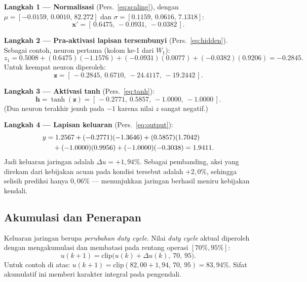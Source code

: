 \textbf{Langkah 1 --- Normalisasi} (Pers.~\ref{eq:scaling}), dengan
$\mu=[-0.0159,\,0.0010,\,82.272]$ dan $\sigma=[0.1159,\,0.0616,\,7.1318]$:
\begin{equation}
\mathbf{x'} = [\,0.6475,\ -0.0931,\ -0.0382\,].
\end{equation}

\textbf{Langkah 2 --- Pra-aktivasi lapisan tersembunyi} (Pers.~\ref{eq:hidden}).
Sebagai contoh, neuron pertama (kolom ke-1 dari $W_1$):
\begin{equation}
z_1 = 0.5008 + (0.6475)(-1.1576) + (-0.0931)(0.0077) + (-0.0382)(0.9206) = -0.2845.
\end{equation}
Untuk keempat neuron diperoleh:
\begin{equation}
\mathbf{z} = [\,-0.2845,\ 0.6710,\ -24.4117,\ -19.2442\,].
\end{equation}

\textbf{Langkah 3 --- Aktivasi tanh} (Pers.~\ref{eq:tanh}):
\begin{equation}
\mathbf{h} = \tanh(\mathbf{z}) = [\,-0.2771,\ 0.5857,\ -1.0000,\ -1.0000\,].
\end{equation}
(Dua neuron terakhir jenuh pada $-1$ karena nilai $z$ sangat negatif.)

\textbf{Langkah 4 --- Lapisan keluaran} (Pers.~\ref{eq:output}):
\begin{align}
y &= 1.2567 + (-0.2771)(-1.3646) + (0.5857)(1.7042) \notag\\
  &\quad + (-1.0000)(0.9956) + (-1.0000)(-0.3038) = 1.9411.
\end{align}
Jadi keluaran jaringan adalah $\Delta u = +1{,}94\%$. Sebagai pembanding, aksi yang
direkam dari kebijakan acuan pada kondisi tersebut adalah $+2{,}0\%$, sehingga selisih
prediksi hanya $0{,}06\%$ --- menunjukkan jaringan berhasil meniru kebijakan kendali.

\subsection{Akumulasi dan Penerapan}
\label{sub:akumulasi}
Keluaran jaringan berupa \emph{perubahan} \emph{duty cycle}. Nilai \emph{duty cycle}
aktual diperoleh dengan mengakumulasi dan membatasi pada rentang operasi
$[70\%,95\%]$:
\begin{equation}
u(k+1) = \mathrm{clip}\big(u(k) + \Delta u(k),\ 70,\ 95\big).
\label{eq:akumulasi}
\end{equation}
Untuk contoh di atas: $u(k+1)=\mathrm{clip}(82{,}00+1{,}94,\,70,\,95)=83{,}94\%$.
Sifat akumulatif ini memberi karakter integral pada pengendali.

